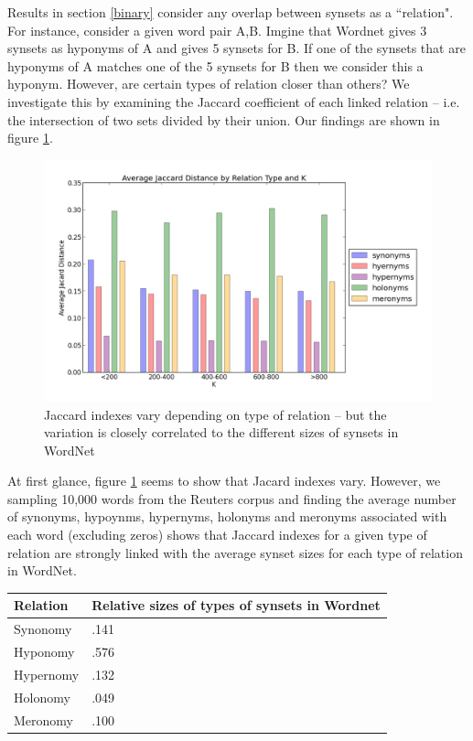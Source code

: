 \documentclass{article}
\begin{document}
Results in section \ref{binary} consider any overlap between synsets as a  ``relation". For instance, consider a given word pair A,B. Imgine that Wordnet gives 3 synsets as hyponyms of A and gives 5 synsets for B. If one of the synsets that are hyponyms of A matches one of the 5 synsets for B then we consider this a hyponym. However, are certain types of relation closer than others? We investigate this by examining the Jaccard coefficient of each linked relation -- i.e. the intersection of two sets divided by their union. Our findings are shown in figure \ref{fig:jacard}.

\begin{figure}[!ht]
\centerline{\includegraphics[scale=.5]{jacard.png}}
  \caption{Jaccard indexes vary depending on type of relation -- but the variation is closely correlated to the different sizes of synsets in WordNet}
  \label{fig:jacard}
\end{figure}

At first glance, figure \ref{fig:jacard} seems to show that Jacard indexes vary. However, we sampling 10,000 words from the Reuters corpus and finding the average number of synonyms, hypoynms, hypernyms, holonyms and meronyms associated with each word (excluding zeros) shows that Jaccard indexes for a given type of relation are strongly linked with the average synset sizes for each type of relation in WordNet.

\begin{center}
\centering
    \begin{tabular}{ | l | l |}
    \hline
Relation & Relative sizes of types of synsets in Wordnet \\  \hline
Synonomy & .141 \\  \hline
Hyponomy & .576  \\  \hline
Hypernomy & .132 \\  \hline
Holonomy & .049 \\  \hline
Meronomy & .100 \\  \hline
    \end{tabular}
\end{center}
\end{document}
